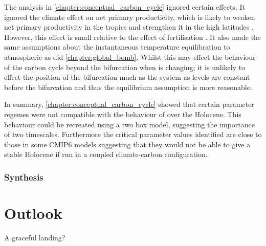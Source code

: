 The analysis in \cref{chapter:conceptual_carbon_cycle} ignored certain effects. It ignored the climate effect on net primary producticity, which is likely to weaken
net primary productivity in the tropics and strengthen it in the high latitudes .
However, this effect is small relative to the effect of  fertilisation \parencite{Arora2020}.
It also made the same assumptions about the instantaneous temperature equilibration to atmospheric  as did \cref{chapter:global_bomb}.
Whilst this may effect the behaviour of the carbon cycle beyond the bifurcation when  is changing;
it is unlikely to effect the position of the bifurcation much as the system as  levels are constant before the bifurcation and thus the equilibrium assumption is more reasonable.

In summary, \cref{chapter:conceptual_carbon_cycle} showed that certain parameter regemes were not compatible with the behaviour of  over the Holocene.
This behaviour could be recreated using a two box model, suggesting the importance of two timescales. Furthermore the critical parameter values identified are close to those in
some CMIP6 models suggesting that they would not be able to give a stable Holocene if run in a coupled climate-carbon configuration.

\subsubsection{}

\subsubsection{}

\subsubsection{Synthesis}

\section{Outlook}

A graceful landing?